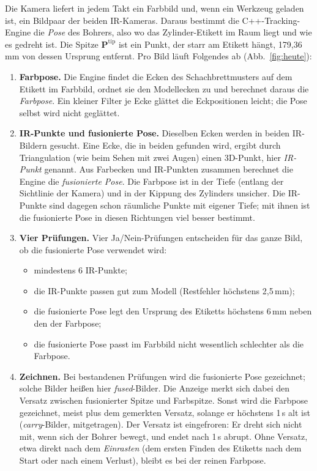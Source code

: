 \documentclass[11pt,a4paper,fleqn]{article}
\begin{document}
Die Kamera liefert in jedem Takt ein Farbbild und, wenn ein Werkzeug geladen ist, ein Bildpaar der beiden
IR-Kameras. Daraus bestimmt die C++-Tracking-Engine die \emph{Pose} des Bohrers, also wo das Zylinder-Etikett im
Raum liegt und wie es gedreht ist. Die Spitze $\mathbf{P}^{\mathrm{tip}}$ ist ein Punkt, der starr am Etikett
hängt, 179,36\,mm von dessen Ursprung entfernt. Pro Bild läuft Folgendes ab (Abb.~\ref{fig:heute}):

\begin{enumerate}
  \item \textbf{Farbpose.} Die Engine findet die Ecken des Schachbrettmusters auf dem Etikett im Farbbild, ordnet
        sie den Modellecken zu und berechnet daraus die \emph{Farbpose}. Ein kleiner Filter je Ecke glättet die
        Eckpositionen leicht; die Pose selbst wird nicht geglättet.
  \item \textbf{IR-Punkte und fusionierte Pose.} Dieselben Ecken werden in beiden IR-Bildern gesucht. Eine Ecke,
        die in beiden gefunden wird, ergibt durch Triangulation (wie beim Sehen mit zwei Augen) einen 3D-Punkt,
        hier \emph{IR-Punkt} genannt. Aus Farbecken und IR-Punkten zusammen berechnet die Engine die
        \emph{fusionierte Pose}. Die Farbpose ist in der Tiefe (entlang der Sichtlinie der Kamera) und in der
        Kippung des Zylinders unsicher. Die IR-Punkte sind dagegen schon räumliche Punkte mit eigener Tiefe; mit
        ihnen ist die fusionierte Pose in diesen Richtungen viel besser bestimmt.
  \item \textbf{Vier Prüfungen.} Vier Ja/Nein-Prüfungen entscheiden für das ganze Bild, ob die fusionierte Pose
        verwendet wird:
        \begin{itemize}[topsep=0pt, partopsep=0pt, itemsep=0pt, parsep=0pt]
          \item mindestens 6 IR-Punkte;
          \item die IR-Punkte passen gut zum Modell (Restfehler höchstens 2,5\,mm);
          \item die fusionierte Pose legt den Ursprung des Etiketts höchstens 6\,mm neben den der Farbpose;
          \item die fusionierte Pose passt im Farbbild nicht wesentlich schlechter als die Farbpose.
        \end{itemize}
  \item \textbf{Zeichnen.} Bei bestandenen Prüfungen wird die fusionierte Pose gezeichnet; solche Bilder heißen
        hier \emph{fused}-Bilder. Die Anzeige merkt sich dabei den Versatz zwischen fusionierter Spitze und
        Farbspitze. Sonst wird die Farbpose gezeichnet, meist plus dem gemerkten Versatz, solange er höchstens
        1\,s alt ist (\emph{carry}-Bilder, \glqq mitgetragen\grqq). Der Versatz ist eingefroren: Er dreht sich
        nicht mit, wenn sich der Bohrer bewegt, und endet nach 1\,s abrupt. Ohne Versatz, etwa direkt nach dem
        \emph{Einrasten} (dem ersten Finden des Etiketts nach dem Start oder nach einem Verlust), bleibt es bei
        der reinen Farbpose.
\end{enumerate}
\end{document}
